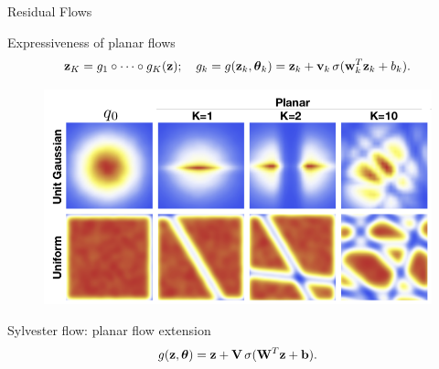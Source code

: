 \documentclass{beamer}
\begin{document}
\begin{frame}{Residual Flows}
	\begin{block}{Expressiveness of planar flows}
		\vspace{-0.5cm}
		\[
		\mathbf{z}_K = g_1 \circ \dots \circ g_K (\mathbf{z}); \quad g_k = g(\mathbf{z}_k, \boldsymbol{\theta}_k) = \mathbf{z}_k + \mathbf{v}_k\, \sigma(\mathbf{w}_k^T\mathbf{z}_k + b_k).
		\]
		\vspace{-0.8cm}
		\begin{figure}
			\centering
			\includegraphics[width=0.7\linewidth]{figs/planar_flows.png}
		\end{figure}
		\vspace{-0.5cm}
	\end{block}
	\begin{block}{Sylvester flow: planar flow extension}
		\vspace{-0.3cm}
		\[
		g(\mathbf{z}, \boldsymbol{\theta}) = \mathbf{z} + \mathbf{V} \, \sigma(\mathbf{W}^T\mathbf{z} + \mathbf{b}).
		\]
	\end{block}
\end{frame}
\end{document}
